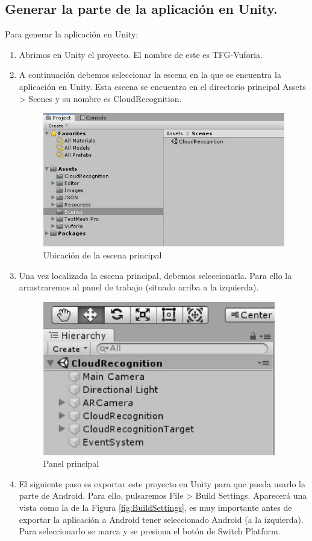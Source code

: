 \subsection{Generar la parte de la aplicación en Unity.}
Para generar la aplicación en Unity:
\begin{enumerate}
    \item Abrimos en Unity el proyecto. El nombre de este es TFG-Vuforia.
    \item A continuación debemos seleccionar la escena en la que se encuentra la aplicación en Unity. Esta escena se encuentra en 
    el directorio principal Assets > Scenes y su nombre es CloudRecognition.
    \begin{figure}[H]
        \centering
        \includegraphics[width=6in]{figures/Appendix-A/CapturaCloudRecognition.JPG}
        \caption{Ubicación de la escena principal}
        \label{fig:CloudRecognitionUbication}
    \end{figure}
    \item Una vez localizada la escena principal, debemos seleccionarla. Para ello la arrastraremos al panel de trabajo (situado 
    arriba a la izquierda).
    \begin{figure}[H]
        \centering
        \includegraphics[width=4in]{figures/Appendix-A/CapturaPanel.JPG}
        \caption{Panel principal}
        \label{fig:CloudRecognitionUbication}
    \end{figure}
    \item El siguiente paso es exportar este proyecto en Unity para que pueda usarlo la parte de Android. Para ello, pulsaremos 
    File > Build Settings. Aparecerá una vista como la de la Figura \ref{fig:BuildSettings}, es muy importante antes de exportar la 
    aplicación a Android tener seleccionado Android (a la izquierda). Para seleccionarlo se marca y se presiona el botón de Switch Platform.


\end{enumerate}

